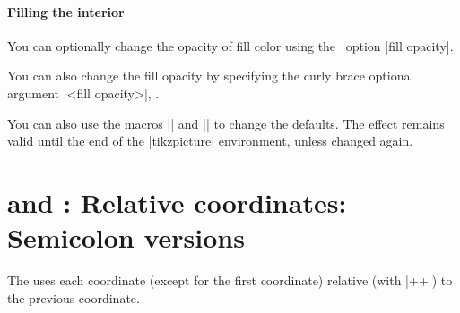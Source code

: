 \paragraph{Filling the interior}

You can optionally change the opacity of fill color using the \Tikz\ option |fill opacity|.

\begin{tzcode}{.3}
\end{tzcode}

You can also change the fill opacity by specifying the  curly brace optional argument |{<fill opacity>}|, .

\begin{tzcode}{.3}
{}
\end{tzcode}

You can also use the macros |\settzfillcolor| and |\settzfillopacity| to change the defaults.
The effect remains valid until the end of the |tikzpicture| environment, unless changed again.

\begin{tzcode}{.3}
{}
\end{tzcode}


\section{\protect\cmd{\tzpath+} and \protect\cmd{\tzpath*+}: Relative coordinates: Semicolon versions}
\label{s:tzpath+}

The  \icmd{\tzpath+} uses each coordinate (except for the first coordinate) relative (with |++|) to the previous coordinate.

